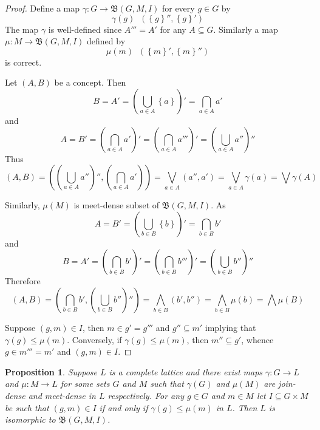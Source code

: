 \documentclass[a4paper]{article}
\newcommand{\obj}[1]{{\left\{ #1 \right \}}}
\newcommand{\brac}[1]{{\left ( #1 \right )}}
\newcommand{\cltc}{\mathfrak{B}}
\newtheorem{prop}{Proposition}
\newcommand{\defn}{\mathop{\overset{\Delta}{=}}\nolimits}
\begin{document}
\begin{proof}
Define a map $\gamma:G\to \cltc(G,M,I)$ for every $g\in G$ by \[\gamma(g) \defn \brac{\obj{g}'', \obj{g}'}\] The map $\gamma$ is well-defined since $A'''=A'$ for any $A\subseteq G$. Similarly a map $\mu:M\to \cltc(G,M,I)$ defined by \[\mu(m)\defn \brac{\obj{m}',\obj{m}''}\] is correct.

Let $(A,B)$ be a concept. Then \[B = A' = \brac{\bigcup_{a\in A}\obj{a}}' = \bigcap_{a\in A} a'\] and \[A = B' = \brac{\bigcap_{a\in A} a'}' = \brac{\bigcap_{a\in A} a'''}' = \brac{\bigcup_{a\in A} a''}''\] Thus \[(A,B) = \brac{\brac{\bigcup_{a\in A} a''}'', \brac{\bigcap_{a\in A} a'}} = \bigvee_{a\in A} (a'',a') = \bigvee_{a\in A} \gamma(a) = \bigvee \gamma(A)\]

Similarly, $\mu(M)$ is meet-dense subset of $\cltc(G,M,I)$. As \[A = B' = \brac{\bigcup_{b\in B}\obj{b}}' = \bigcap_{b\in B} b'\] and \[B = A' = \brac{\bigcap_{b\in B} b'}' = \brac{\bigcap_{b\in B} b'''}' = \brac{\bigcup_{b\in B} b''}''\]
Therefore \[(A,B) = \brac{\bigcap_{b\in B} b', \brac{\bigcup_{b\in B} b''}''} = \bigwedge_{b\in B} (b', b'') = \bigwedge_{b\in B} \mu(b)=\bigwedge \mu(B)\]

Suppose $(g,m)\in I$, then $m\in g' = g'''$ and $g''\subseteq m'$ implying that $\gamma(g)\leq \mu(m)$. Conversely, if $\gamma(g)\leq \mu(m)$, then $m''\subseteq g'$, whence $g\in m''' = m'$ and $(g,m)\in I$.
\end{proof}

\begin{prop} Suppose $L$ is a complete lattice and there exist maps $\gamma:G\to L$ and $\mu:M\to L$ for some sets $G$ and $M$ such that $\gamma(G)$ and $\mu(M)$ are join-dense and meet-dense in $L$ respectively. For any $g\in G$ and $m\in M$ let $I\subseteq G\times M$ be such that $(g,m)\in I$ if and only if $\gamma(g)\leq \mu(m)$ in $L$. Then $L$ is isomorphic to $\cltc(G,M,I)$.
\end{prop}
\end{document}
